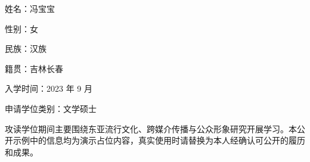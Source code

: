 姓名：冯宝宝

性别：女

民族：汉族

籍贯：吉林长春

入学时间：2023 年 9 月

申请学位类别：文学硕士

攻读学位期间主要围绕东亚流行文化、跨媒介传播与公众形象研究开展学习。本公开示例中的信息均为演示占位内容，真实使用时请替换为本人经确认可公开的履历和成果。
